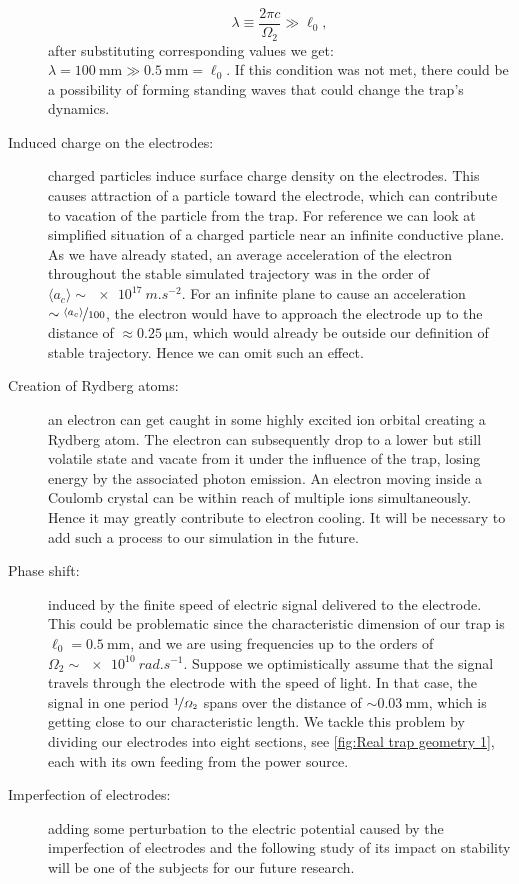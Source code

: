 \begin{description}
\begin{equation}
	\lambda \equiv \dfrac{2\pi c}{\Omega_2} \gg \ell_0,
\end{equation}
after substituting corresponding values we get: $\lambda = \SI{100}{\mm} \gg \SI{0.5}{\mm} = \ell_0$. If this condition was not met, there could be a possibility of forming standing waves that could change the trap's dynamics.  
	\item[Induced charge on the electrodes:] charged particles induce surface charge density on the electrodes. This causes attraction of a particle toward the electrode, which can contribute to vacation of the particle from the trap. For reference we can look at simplified situation of a charged particle near an infinite conductive plane. As we have already stated, an average acceleration of the electron throughout the stable simulated trajectory was in the order of $\langle a_c \rangle \sim \SI{e17}{m.s^{-2}}$. For an infinite plane to cause an acceleration $\sim \nicefrac{\langle a_c \rangle}{100}$, the electron would have to approach the electrode up to the distance of $\approx \SI{0.25}{\micro\meter}$, which would already be outside our definition of stable trajectory. Hence we can omit such an effect. 
	\item[Creation of Rydberg atoms:] an electron can get caught in some highly excited ion orbital creating a Rydberg atom. The electron can subsequently drop to a lower but still volatile state and vacate from it under the influence of the trap, losing energy by the associated photon emission. An electron moving inside a Coulomb crystal can be within reach of multiple ions simultaneously. Hence it may greatly contribute to electron cooling. It will be necessary to add such a process to our simulation in the future.
	\item[Phase shift:] induced by the finite speed of electric signal delivered to the electrode. This could be problematic since the characteristic dimension of our trap is $\ell_0 = \SI{0.5}{\mm}$, and we are using frequencies up to the orders of $\Omega_2 \sim \SI{e10}{rad.s^{-1}}$. Suppose we optimistically assume that the signal travels through the electrode with the speed of light. In that case, the signal in one period $\nicefrac{1}{\Omega_2}$ spans over the distance of $\sim \SI{0.03}{\mm}$, which is getting close to our characteristic length. We tackle this problem by dividing our electrodes into eight sections, see \ref{fig:Real trap geometry 1}, each with its own feeding from the power source.
	\item[Imperfection of electrodes:] adding some perturbation to the electric potential caused by the imperfection of electrodes and the following study of its impact on stability will be one of the subjects for our future research.	

\end{description}
